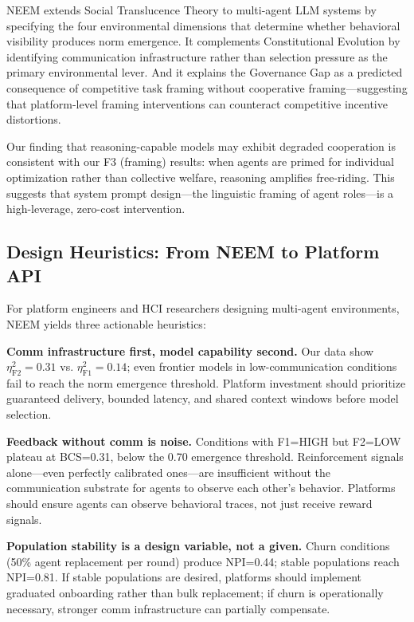 NEEM extends Social Translucence Theory to multi-agent LLM systems by specifying the four environmental dimensions that determine whether behavioral visibility produces norm emergence. It complements Constitutional Evolution \citep{constitutional2026} by identifying communication infrastructure rather than selection pressure as the primary environmental lever. And it explains the Governance Gap \citep{demooy2026} as a predicted consequence of competitive task framing without cooperative framing—suggesting that platform-level framing interventions can counteract competitive incentive distortions.

Our finding that reasoning-capable models may exhibit degraded cooperation \citep{piedrahita2025free} is consistent with our F3 (framing) results: when agents are primed for individual optimization rather than collective welfare, reasoning amplifies free-riding. This suggests that system prompt design—the linguistic framing of agent roles—is a high-leverage, zero-cost intervention.

\subsection{Design Heuristics: From NEEM to Platform API}
\label{sec:design-heuristics}

For platform engineers and HCI researchers designing multi-agent environments, NEEM yields three actionable heuristics:

\textbf{Comm infrastructure first, model capability second.} Our data show $\eta^2_{\mathrm{F2}}=0.31$ vs. $\eta^2_{\mathrm{F1}}=0.14$; even frontier models in low-communication conditions fail to reach the norm emergence threshold. Platform investment should prioritize guaranteed delivery, bounded latency, and shared context windows before model selection.

\textbf{Feedback without comm is noise.} Conditions with F1=HIGH but F2=LOW plateau at BCS=0.31, below the 0.70 emergence threshold. Reinforcement signals alone—even perfectly calibrated ones—are insufficient without the communication substrate for agents to observe each other's behavior. Platforms should ensure agents can observe behavioral traces, not just receive reward signals.

\textbf{Population stability is a design variable, not a given.} Churn conditions (50\% agent replacement per round) produce NPI=0.44; stable populations reach NPI=0.81. If stable populations are desired, platforms should implement graduated onboarding rather than bulk replacement; if churn is operationally necessary, stronger comm infrastructure can partially compensate.

